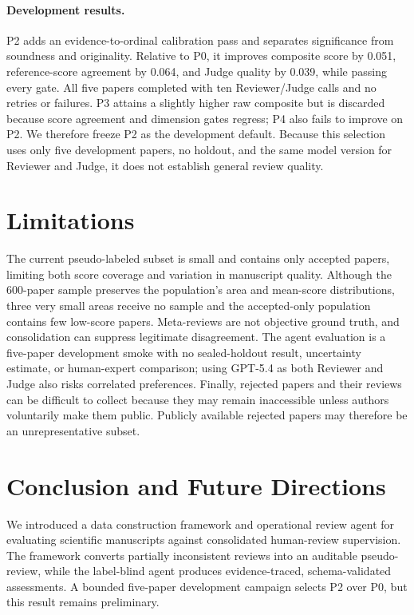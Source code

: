 \documentclass{article}
\begin{document}
\paragraph{Development results.}
P2 adds an evidence-to-ordinal calibration pass and separates significance from soundness and originality. Relative to P0, it improves composite score by 0.051, reference-score agreement by 0.064, and Judge quality by 0.039, while passing every gate. All five papers completed with ten Reviewer/Judge calls and no retries or failures. P3 attains a slightly higher raw composite but is discarded because score agreement and dimension gates regress; P4 also fails to improve on P2. We therefore freeze P2 as the development default. Because this selection uses only five development papers, no holdout, and the same model version for Reviewer and Judge, it does not establish general review quality.

\section{Limitations}

The current pseudo-labeled subset is small and contains only accepted papers, limiting both score coverage and variation in manuscript quality. Although the 600-paper sample preserves the population's area and mean-score distributions, three very small areas receive no sample and the accepted-only population contains few low-score papers. Meta-reviews are not objective ground truth, and consolidation can suppress legitimate disagreement. The agent evaluation is a five-paper development smoke with no sealed-holdout result, uncertainty estimate, or human-expert comparison; using GPT-5.4 as both Reviewer and Judge also risks correlated preferences. Finally, rejected papers and their reviews can be difficult to collect because they may remain inaccessible unless authors voluntarily make them public. Publicly available rejected papers may therefore be an unrepresentative subset.

\section{Conclusion and Future Directions}

We introduced a data construction framework and operational review agent for evaluating scientific manuscripts against consolidated human-review supervision. The framework converts partially inconsistent reviews into an auditable pseudo-review, while the label-blind agent produces evidence-traced, schema-validated assessments. A bounded five-paper development campaign selects P2 over P0, but this result remains preliminary.
\end{document}
